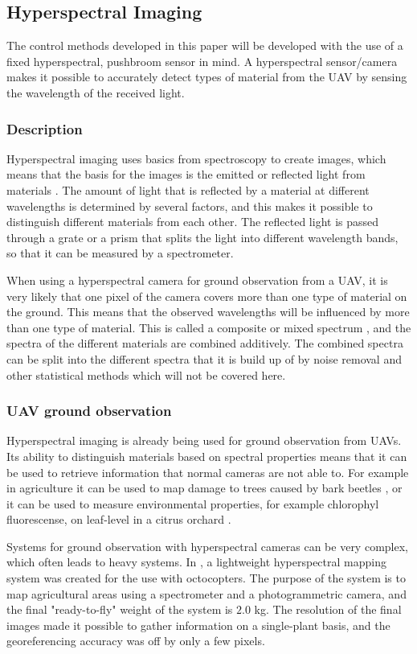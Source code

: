 \subsection{Hyperspectral Imaging}
The control methods developed in this paper will be developed with the use of a fixed hyperspectral, pushbroom sensor in mind. A hyperspectral sensor/camera makes it possible to accurately detect types of material from the UAV by sensing the wavelength of the received light.


\subsubsection{Description}
Hyperspectral imaging uses basics from spectroscopy to create images, which means that the basis for the images is the emitted or reflected light from materials \cite{hypSMITH}. The amount of light that is reflected by a material at different wavelengths is determined by several factors, and this makes it possible to distinguish different materials from each other. The reflected light is passed through a grate or a prism that splits the light into different wavelength bands, so that it can be measured by a spectrometer.

When using a hyperspectral camera for ground observation from a UAV, it is very likely that one pixel of the camera covers more than one type of material on the ground. This means that the observed wavelengths will be influenced by more than one type of material. This is called a composite or mixed spectrum \cite{hypSMITH}, and the spectra of the different materials are combined additively. The combined spectra can be split into the different spectra that it is build up of by noise removal and other statistical methods which will not be covered here.


\subsubsection{UAV ground observation}
Hyperspectral imaging is already being used for ground observation from UAVs. Its ability to distinguish materials based on spectral properties means that it can be used to retrieve information that normal cameras are not able to. For example in agriculture it can be used to map damage to trees caused by bark beetles \cite{beetleNASI}, or it can be used to measure environmental properties, for example chlorophyl fluorescense, on leaf-level in a citrus orchard \cite{waterStressBERNI}.

Systems for ground observation with hyperspectral cameras can be very complex, which often leads to heavy systems. In \cite{hymsySUOMALAINEN}, a lightweight hyperspectral mapping system was created for the use with octocopters. The purpose of the system is to map agricultural areas using a spectrometer and a photogrammetric camera, and the final "ready-to-fly" weight of the system is $2.0$ kg. The resolution of the final images made it possible to gather information on a single-plant basis, and the georeferencing accuracy was off by only a few pixels.

